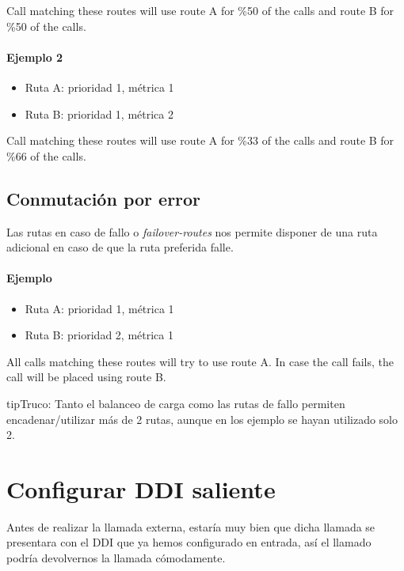 \documentclass[letterpaper,10pt,spanish]{sphinxmanual}
\begin{document}
Call matching these routes will use route A for \%50 of the calls and route B for
\%50 of the calls.
\paragraph{Ejemplo 2}
\begin{itemize}
\item {} 
Ruta A: prioridad 1, métrica 1

\item {} 
Ruta B: prioridad 1, métrica 2

\end{itemize}

Call matching these routes will use route A for \%33 of the calls and route B for
\%66 of the calls.


\subsection{Conmutación por error}
\label{external_outgoing_calls/call_routing:failover-routes}
Las rutas en caso de fallo o \emph{failover-routes} nos permite disponer de una ruta adicional en caso de que la ruta preferida falle.
\paragraph{Ejemplo}
\begin{itemize}
\item {} 
Ruta A: prioridad 1, métrica 1

\item {} 
Ruta B: prioridad 2, métrica 1

\end{itemize}

All calls matching these routes will try to use route A. In case the call fails,
the call will be placed using route B.

\begin{notice}{tip}{Truco:}
Tanto el balanceo de carga como las rutas de fallo permiten encadenar/utilizar más de 2 rutas, aunque en los ejemplo se hayan utilizado solo 2.
\end{notice}


\section{Configurar DDI saliente}
\label{external_outgoing_calls/external_ddi:external-ddi}\label{external_outgoing_calls/external_ddi::doc}\label{external_outgoing_calls/external_ddi:outgoing-ddi-configuration}
Antes de realizar la llamada externa, estaría muy bien que dicha llamada se presentara con el DDI que ya hemos configurado en entrada, así el llamado podría devolvernos la llamada cómodamente.
\end{document}
